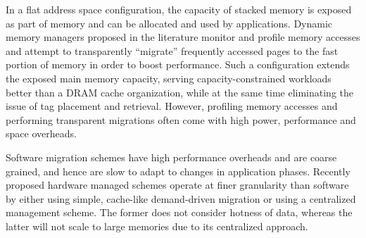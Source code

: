 In a flat address space configuration, the capacity of stacked memory is exposed as part of memory and can be allocated and used by applications. Dynamic memory managers proposed in the literature \cite{sim-micro2014,meswani-HPCA21,CAMEO} monitor and profile memory accesses and attempt to transparently ``migrate'' frequently accessed pages to the fast portion of memory in order to boost performance. Such a configuration extends the exposed main memory capacity, serving capacity-constrained workloads better than a DRAM cache organization, while at the same time eliminating the issue of tag placement and retrieval. However, profiling memory accesses and performing transparent migrations often come with high power, performance and space overheads. 



Software migration schemes \cite{meswani-HPCA21} have high performance overheads and are coarse grained, and hence are slow to adapt to changes in application phases. Recently proposed hardware managed schemes \cite{sim-micro2014,CAMEO} operate at finer granularity than software by either using simple, cache-like demand-driven migration or using a centralized management scheme. The former does not consider hotness of data, whereas the latter will not scale to large memories due to its centralized approach.

